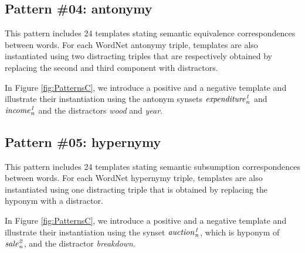 \documentclass[11pt]{article}
\newcommand{\WORDNET}{WordNet}
\newcommand{\synset}[3]{{\it{#1}_{#3}^{#2}}}
\begin{document}
\subsection{Pattern \#04: antonymy}

This pattern includes 24 templates stating semantic equivalence correspondences between words. For each \WORDNET{} antonymy triple, templates are also instantiated using two distracting triples that are respectively obtained by replacing the second and third component with distractors.

In Figure \ref{fig:PatternsC}, we introduce a positive and a negative template and illustrate their instantiation using the antonym synsets $\synset{expenditure}{1}{n}$ and $\synset{income}{1}{n}$ and the distractors {\it wood} and {\it year}.

\subsection{Pattern \#05: hypernymy}

This pattern includes 24 templates stating semantic subsumption correspondences between words. For each \WORDNET{} hypernymy triple, templates are also instantiated using one distracting triple that is obtained by replacing the hyponym with a distractor.

In Figure \ref{fig:PatternsC}, we introduce a positive and a negative template and illustrate their instantiation using the synset $\synset{auction}{1}{n}$, which is hyponym of $\synset{sale}{2}{n}$, and the distractor {\it breakdown}.
\end{document}
